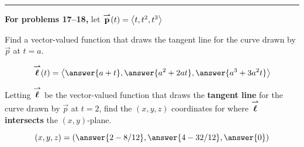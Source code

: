 \documentclass{ximera}
\begin{document}
\hrule

\textbf{For problems 17--18,} let ${\overset{\boldsymbol{\rightharpoonup}}{\mathbf{p}}}(t) = \left\langle t,t^2,t^3\right\rangle$

\begin{problem}
  Find a vector-valued function that draws the tangent line for the
  curve drawn by $\vec{p}$ at $t=a$.
  \begin{prompt}
  \[
  \vecl(t) = \vector{\answer{a+t},\answer{a^2+2at},\answer{a^3 + 3a^2t}}
  \]
  \end{prompt}

  \vfill
  
\end{problem}


\begin{problem}
  Letting ${\overset{\boldsymbol{\rightharpoonup}}{\mathbf{\boldsymbol{\ell}}}}$ be the vector-valued function that draws the \textbf{tangent
  line} for the curve drawn by $\vec{p}$ at $t=2$, find the $(x,y,z)$
  coordinates for where ${\overset{\boldsymbol{\rightharpoonup}}{\mathbf{\boldsymbol{\ell}}}}$ \textbf{intersects} the $(x,y)$-plane.
  \begin{prompt}
    \[
    (x,y,z) = \left(\answer{2-8/12},\answer{4-32/12},\answer{0}\right)
    \]
  \end{prompt}

  \vfill
  
\end{problem}
\end{document}
